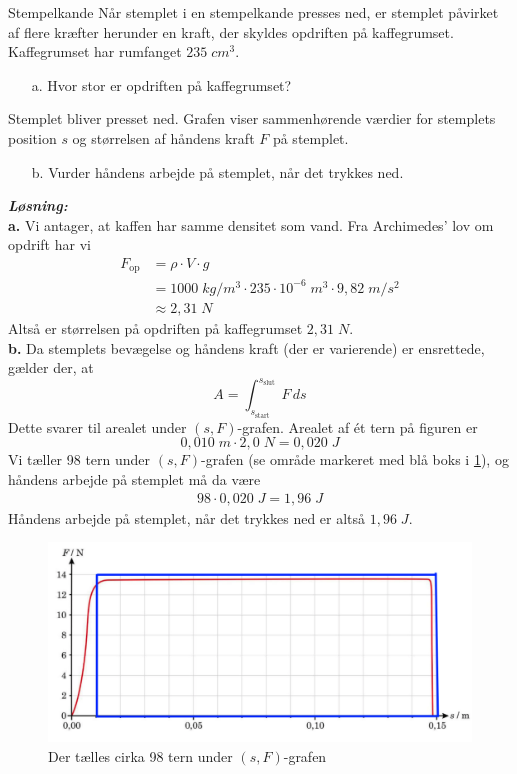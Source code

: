 \documentclass{report}
\newcommand{\sol}{\setlength{\parindent}{0cm}\textbf{\textit{Løsning:}}\setlength{\parindent}{1cm}}
\begin{document}
\begin{question}{Stempelkande}{}
  Når stemplet i en stempelkande presses ned, er stemplet påvirket af flere kræfter herunder en kraft, der skyldes opdriften på kaffegrumset. Kaffegrumset har rumfanget $235 \;\unit{cm^3} $.
  \begin{itemize}
    \item[a.] Hvor stor er opdriften på kaffegrumset?
  \end{itemize}
Stemplet bliver presset ned. Grafen viser sammenhørende værdier for stemplets position $s$ og størrelsen af håndens kraft $F$ på stemplet.
\begin{itemize}
  \item[b.] Vurder håndens arbejde på stemplet, når det trykkes ned.
\end{itemize}
\end{question}
\sol \\
\textbf{a.}
Vi antager, at kaffen har samme densitet som vand.
Fra Archimedes' lov om opdrift har vi
\begin{equation*}
\begin{split}
  F _{\text{op} }&= \rho \cdot V \cdot g \\
  &=1000 \;\unit{kg/m^3} \cdot 235 \cdot 10 ^{-6} \;\unit{m^3} \cdot 9,82 \;\unit{m/s^2} \\
  &\approx 2,31 \;\unit{N} 
\end{split}
\end{equation*}
Altså er størrelsen på opdriften på kaffegrumset $2,31 \;\unit{N} $.\\[1ex]
\textbf{b.}
Da stemplets bevægelse og håndens kraft (der er varierende) er ensrettede, gælder der, at
\[
A= \int_{s_{\text{start} }}^{s_{\text{slut} }} F \,ds 
\] 
Dette svarer til arealet under $(s,F)$-grafen.
Arealet af ét tern på figuren er 
\[
0,010 \;\unit{m}  \cdot 2,0 \;\unit{N} =0,020 \;\unit{J} 
\] 
Vi tæller 98 tern under $(s,F)$-grafen (se område markeret med blå boks i \cref{fig:sF}), og håndens arbejde på stemplet må da være 
\begin{equation*}
\begin{split}
  98 \cdot 0,020 \;\unit{J} =1,96 \;\unit{J} 
\end{split}
\end{equation*}
Håndens arbejde på stemplet, når det trykkes ned er altså $1,96 \;\unit{J} $.
\begin{figure}[H]
\begin{center}
  \includegraphics[width=\textwidth]{sF.png}
\end{center}
  \caption{Der tælles cirka 98 tern under $(s,F)$-grafen}
\label{fig:sF}
\end{figure}
\end{document}
